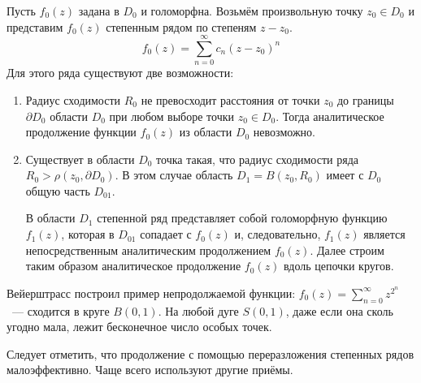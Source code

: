 \documentclass[a4paper, 12pt]{article}
\begin{document}
Пусть $f_0(z)$ задана в $D_0$ и голоморфна. Возьмём произвольную точку $z_0 \in D_0$ и представим $f_0(z)$ степенным рядом по степеням $z-z_0$.
\[f_0(z) = \sum_{n=0}^\infty c_n(z-z_0)^n\]
Для этого ряда существуют две возможности:
\begin{enumerate}
    \item Радиус сходимости $R_0$ не превосходит расстояния от точки $z_0$ до границы $\partial D_0$ области $D_0$ при любом выборе точки $z_0 \in D_0$.
    Тогда аналитическое продолжение функции $f_0(z)$ из области $D_0$ невозможно.

    \item Существует в области $D_0$ точка такая, что радиус сходимости ряда $R_0 > \rho(z_0, \partial D_0)$. В этом случае область $D_1 = B(z_0, R_0)$ имеет с $D_0$ общую часть $D_{01}$. \\
    \begin{center}
    \end{center}
    В области $D_1$ степенной ряд представляет собой голоморфную функцию $f_1(z)$, которая в $D_{01}$ сопадает с $f_0(z)$ и, следовательно, $f_1(z)$ является непосредственным аналитическим продолжением $f_0(z)$.
    Далее строим таким образом аналитическое продолжение $f_0(z)$ вдоль цепочки кругов.
\end{enumerate}
Вейерштрасс построил пример непродолжаемой функции: $\displaystyle f_0(z) = \sum_{n=0}^\infty z^{2^n}$~--- сходится в круге $B(0,1)$.
На любой дуге $S(0,1)$, даже если она сколь угодно мала, лежит бесконечное число особых точек.

Следует отметить, что продолжение с помощью переразложения степенных рядов малоэффективно. Чаще всего используют другие приёмы.
\end{document}
